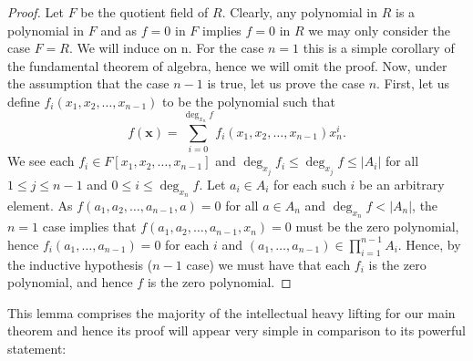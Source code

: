			\begin{proof}[Proof] Let  $F$ be the quotient field of
				$R$. Clearly, any polynomial in $R$ is a
				polynomial in $F$ and as $f=0$ in $F$ implies
				$f=0$ in $R$ we may only consider the case
				$F=R$. We will induce on n. For the case $n=1$
				this is a simple corollary of the fundamental
				theorem of algebra, hence we will omit the
				proof. Now, under the assumption that the case
				$n-1$ is true, let us prove the case $n$.
				First, let us define  $f_i \left( x_1, x_2,
				\ldots, x_{n-1} \right) $ to be the polynomial
				such that \[f\left( \textbf{x} \right)  =
				\sum_{i=0}^{\deg _{x_{n}} f} f_i \left( x_1,
			x_2, \ldots, x_{n-1} \right)  x_n ^{i}.\]  We
			see each $f_i \in F[x_1, x_2, \ldots, x_{n-1}]$
				and $\deg_{x_{j}} f_i \le \deg _{x_{j}} f \le
				\left| A_i \right| $ for all $1 \le j \le n-1$
				and $0 \le i \le \deg _{x_{n}} f$. Let $a_i \in
				A_i$ for each such $i$ be an arbitrary element.
				As $f\left( a_1, a_2, \ldots, a_{n-1}, a
				\right) = 0$ for all $a \in A_n$ and $\deg
				_{x_{n}} f < \left| A_n \right| $, the $n=1$
				case implies that $f\left( a_1, a_2, \ldots,
				a_{n-1}, x_{n} \right) = 0$ must be the zero
				polynomial, hence $f_i \left( a_1, \ldots,
				a_{n-1} \right) =0$ for each $i$ and $
				\left( a_1, \ldots, a_{n-1} \right)  \in \prod_{i= 1}^{n-1} A_i$. Hence, by
			the inductive hypothesis ($n-1$ case) we must have that
		each $f_i$ is the zero polynomial, and hence $f$ is the zero
	polynomial.  \end{proof} This lemma comprises the majority of the
	intellectual heavy lifting for our main theorem and hence its proof
	will appear very simple in comparison to its powerful statement:
	\newpage
